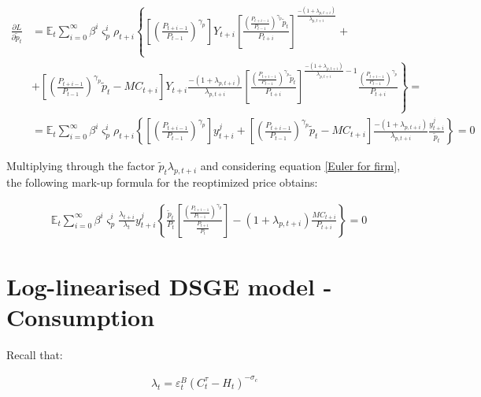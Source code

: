 \documentclass{pracamgr}
\numberwithin{equation}{section}
\begin{document}
\begin{align}
\frac{\partial L}{\partial \widetilde{p}_{t}} &= \mathbb{E}_{t}  \sum\limits_{i=0}^{\infty} \beta^{i} \varsigma_{p}^{i} \rho_{t+i} \left\{ \left[
\left(\frac{P_{t+i-1}}{P_{t-1}} \right)^{\gamma_{p}} \right] Y_{t+i} \left[ \frac{\left(\frac{P_{t+i-1}}{P_{t-1}} \right)^{\gamma_{p}}\widetilde{p}_{t}}{P_{t+i}} \right]^{\frac{-(1+\lambda_{p,t+i})}{\lambda_{p,t+i}}} \right. + \nonumber \\
& \left. + \left[\left(\frac{P_{t+i-1}}{P_{t-1}} \right)^{\gamma_{p}}\widetilde{p}_{t} -MC_{t+i} \right] Y_{t+i} \frac{-(1+\lambda_{p,t+i})}{\lambda_{p,t+i}} \left[ \frac{\left(\frac{P_{t+i-1}}{P_{t-1}} \right)^{\gamma_{p}}\widetilde{p}_{t}}{P_{t+i}} \right]^{\frac{-(1+\lambda_{p,t+i})}{\lambda_{p,t+i}}-1} \frac{\left(\frac{P_{t+i-1}}{P_{t-1}} \right)^{\gamma_{p}}}{P_{t+i}} \right\} = \nonumber \\
& = \mathbb{E}_{t}  \sum\limits_{i=0}^{\infty} \beta^{i} \varsigma_{p}^{i} \rho_{t+i} \left\{ \left[ \left(\frac{P_{t+i-1}}{P_{t-1}} \right)^{\gamma_{p}} \right] y^{j}_{t+i} + \left[\left(\frac{P_{t+i-1}}{P_{t-1}} \right)^{\gamma_{p}}\widetilde{p}_{t} -MC_{t+i} \right] \frac{-(1+\lambda_{p,t+i})}{\lambda_{p,t+i}} \frac{y_{t+i}^{j}}{\widetilde{p}_{t}} \right\} = 0
\end{align}

Multiplying through the factor $\widetilde{p}_{t} \lambda_{p,t+i}$ and considering equation \ref{Euler for firm}, the following mark-up formula for the reoptimized price obtains:

\begin{align}
&\mathbb{E}_{t}  \sum\limits_{i=0}^{\infty} \beta^{i} \varsigma_{p}^{i} \frac{\lambda_{t+i}}{\lambda_{t}} y_{t+i}^{j} \left\{ \frac{\widetilde{p}_{t}}{P_{t}} \left[ \frac{ \left(\frac{P_{t+i-1}}{P_{t-1}} \right)^{\gamma_{p}}}{\frac{P_{t+i}}{P_{t}}} \right] - (1+\lambda_{p,t+i})\frac{MC_{t+i}}{P_{t+i}} \right\} = 0
\end{align}

\section*{Log-linearised DSGE model - Consumption}

Recall that:

\begin{align}
\lambda_{t} = \varepsilon_{t}^{B} \left( C_{t}^{\tau} - H_{t} \right)^{-\sigma_{c}}
\end{align}
\end{document}
